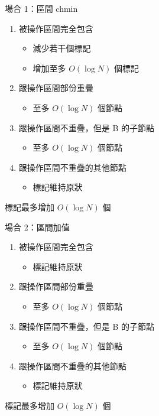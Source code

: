\begin{frame}{}
    場合 1：區間 chmin

    \begin{enumerate}[A]
        \item 被操作區間完全包含
        \begin{itemize}
            \item 減少若干個標記
            \item 增加至多 $O(\log N)$ 個標記
        \end{itemize}
        \item 跟操作區間部份重疊
        \begin{itemize}
            \item 至多 $O(\log N)$ 個節點
        \end{itemize}
        \item 跟操作區間不重疊，但是 B 的子節點
        \begin{itemize}
            \item 至多 $O(\log N)$ 個節點
        \end{itemize}
        \item 跟操作區間不重疊的其他節點
        \begin{itemize}
            \item 標記維持原狀
        \end{itemize}
    \end{enumerate}

    標記最多增加 $O(\log N)$ 個
\end{frame}

\begin{frame}{}
    場合 2：區間加值

    \begin{enumerate}[A]
        \item 被操作區間完全包含
        \begin{itemize}
            \item 標記維持原狀
        \end{itemize}
        \item 跟操作區間部份重疊
        \begin{itemize}
            \item 至多 $O(\log N)$ 個節點
        \end{itemize}
        \item 跟操作區間不重疊，但是 B 的子節點
        \begin{itemize}
            \item 至多 $O(\log N)$ 個節點
        \end{itemize}
        \item 跟操作區間不重疊的其他節點
        \begin{itemize}
            \item 標記維持原狀
        \end{itemize}
    \end{enumerate}

    標記最多增加 $O(\log N)$ 個
\end{frame}

